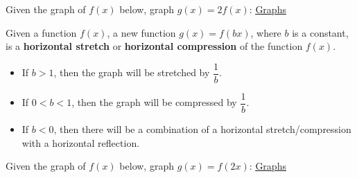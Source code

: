 \documentclass[../mathNotesPreamble]{subfiles}
\begin{document}
  \begin{ex*}
    Given the graph of $f(x)$ below, graph $g(x)=2f(x)$:
    \textcolor{blue}{\underline{\href{https://www.desmos.com/calculator/7khrjmegyi}{Graphs}}}
    \begin{center}
    \end{center}
  \end{ex*}
  \pagebreak

  \begin{defn*}
    Given a function $f(x)$, a new function $g(x)=f(bx)$, where $b$ is a constant, is a \textbf{horizontal stretch} or \textbf{horizontal compression} of the function $f(x)$.
    \begin{itemize}
      \item If $b>1$, then the graph will be stretched by $\dfrac{1}{b}$.
      \item If $0<b<1$, then the graph will be compressed by $\dfrac{1}{b}$.
      \item If $b<0$, then there will be a combination of a horizontal stretch/compression with a horizontal reflection.
    \end{itemize}
  \end{defn*}

  \begin{ex*}
    Given the graph of $f(x)$ below, graph $g(x)=f(2x)$:
    \textcolor{blue}{\underline{\href{https://www.desmos.com/calculator/7khrjmegyi}{Graphs}}}
    \begin{center}
    \end{center}
  \end{ex*}
  \pagebreak
\end{document}
